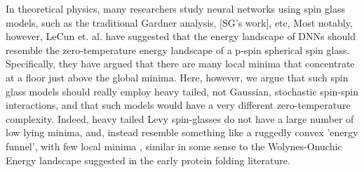 In theoretical physics, many researchers study neural networks using spin glass models, such as the traditional Gardner analysis, [SG's work], etc,
Most notably, however, LeCun et. al. have suggested that the energy landscape of DNNs should resemble the 
zero-temperature energy landscape of a p-spin spherical spin glass. Specifically, they have argued that there are many local minima
that concentrate at a floor just above the global minima.  Here, however, we argue that such spin glass models should really employ
heavy tailed, not Gaussian, stochastic spin-spin interactions, and that such models would have a very different zero-temperature
complexity.  Indeed, heavy tailed Levy spin-glasses do not have a large number of low lying minima, and, instead resemble something like a
ruggedly convex 'energy funnel', with few local minima \cite{GB1993}, similar in some sense to the Wolynes-Onuchic Energy landscape
suggested in the early protein folding literature.




